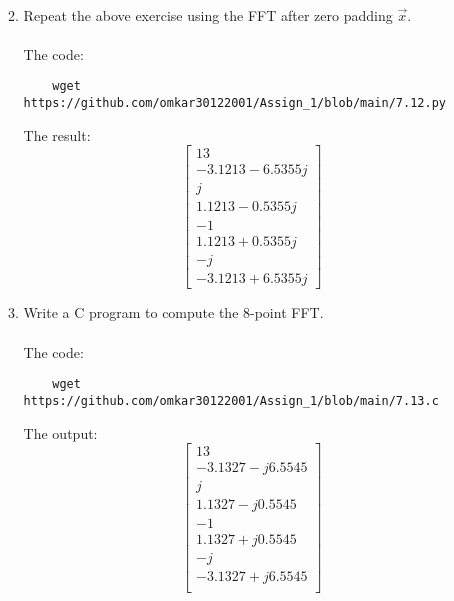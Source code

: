 \documentclass[journal,12pt,twocolumn]{IEEEtran}
\renewcommand\thesection{\arabic{section}}
\begin{document}
\begin{enumerate}[label=\thesection.\arabic*]
\begin{enumerate}[label=\arabic*.,ref=\thesection.\theenumi]
\begin{align}
	\end{align}
	\item Repeat the above exercise using the FFT
	after zero padding $\vec{x}$. \\
	\solution \\
	The code:
	\begin{lstlisting}
	wget https://github.com/omkar30122001/Assign_1/blob/main/7.12.py
	\end{lstlisting}
	The result:
	\begin{equation}
		\begin{bmatrix}
			13\\
			-3.1213-6.5355j\\
			j\\
			1.1213-0.5355j\\
			-1\\
			1.1213+0.5355j\\
			-j\\
			-3.1213+6.5355j
		\end{bmatrix}
	\end{equation}
	\item Write a C program to compute the 8-point FFT. \\
	\solution \\
	The code:
	\begin{lstlisting}
	wget https://github.com/omkar30122001/Assign_1/blob/main/7.13.c
	\end{lstlisting}
The output:
\begin{equation}
	\begin{bmatrix}
		13\\
		-3.1327 - j6.5545\\
		j\\
		1.1327 - j0.5545\\
		-1\\
		1.1327 + j0.5545\\
		- j\\
		-3.1327 + j6.5545\\
	\end{bmatrix}
\end{equation}
\end{enumerate}

\end{enumerate}
\end{document}

